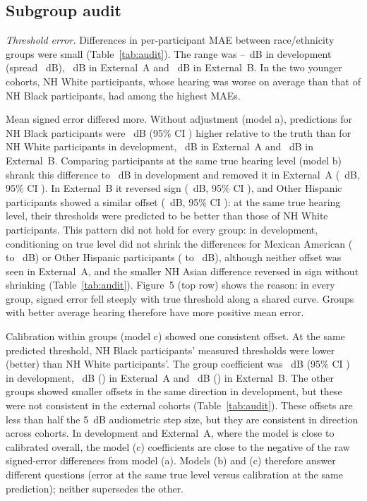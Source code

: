 \documentclass[11pt]{article}
\begin{document}
\subsection*{Subgroup audit}
\emph{Threshold error.} Differences in per-participant MAE between race/ethnicity groups were small (Table~\ref{tab:audit}). The range was \GMaeMinDev{}--\GMaeMaxDev{}~dB in development (spread \GMaeRangeDev{}~dB), \GMaeRangeExtA{}~dB in External~A and \GMaeRangeExtB{}~dB in External~B. In the two younger cohorts, NH White participants, whose hearing was worse on average than that of NH Black participants, had among the highest MAEs.

Mean signed error differed more. Without adjustment (model a), predictions for NH Black participants were \EffRawBlackDev{}~dB (95\% CI \EffCiRawBlackDev{}) higher relative to the truth than for NH White participants in development, \EffRawBlackExtA{}~dB in External~A and \EffRawBlackExtB{}~dB in External~B. Comparing participants at the same true hearing level (model b) shrank this difference to \EffCondBlackDev{}~dB in development and removed it in External~A (\EffCondBlackExtA{}~dB, 95\% CI \EffCiCondBlackExtA{}). In External~B it reversed sign (\EffCondBlackExtB{}~dB, 95\% CI \EffCiCondBlackExtB{}), and Other Hispanic participants showed a similar offset (\EffCondOthHispExtB{}~dB, 95\% CI \EffCiCondOthHispExtB{}): at the same true hearing level, their thresholds were predicted to be better than those of NH White participants. This pattern did not hold for every group: in development, conditioning on true level did not shrink the differences for Mexican American (\EffRawMexAmDev{} to \EffCondMexAmDev{}~dB) or Other Hispanic participants (\EffRawOthHispDev{} to \EffCondOthHispDev{}~dB), although neither offset was seen in External~A, and the smaller NH Asian difference reversed in sign without shrinking (Table~\ref{tab:audit}). Figure~5 (top row) shows the reason: in every group, signed error fell steeply with true threshold along a shared curve. Groups with better average hearing therefore have more positive mean error.

Calibration within groups (model c) showed one consistent offset. At the same predicted threshold, NH Black participants' measured thresholds were lower (better) than NH White participants'. The group coefficient was \EffCalBlackDev{}~dB (95\% CI \EffCiCalBlackDev{}) in development, \EffCalBlackExtA{}~dB (\EffCiCalBlackExtA{}) in External~A and \EffCalBlackExtB{}~dB (\EffCiCalBlackExtB{}) in External~B. The other groups showed smaller offsets in the same direction in development, but these were not consistent in the external cohorts (Table~\ref{tab:audit}). These offsets are less than half the 5~dB audiometric step size, but they are consistent in direction across cohorts. In development and External~A, where the model is close to calibrated overall, the model (c) coefficients are close to the negative of the raw signed-error differences from model (a). Models (b) and (c) therefore answer different questions (error at the same true level versus calibration at the same prediction); neither supersedes the other.
\end{document}
